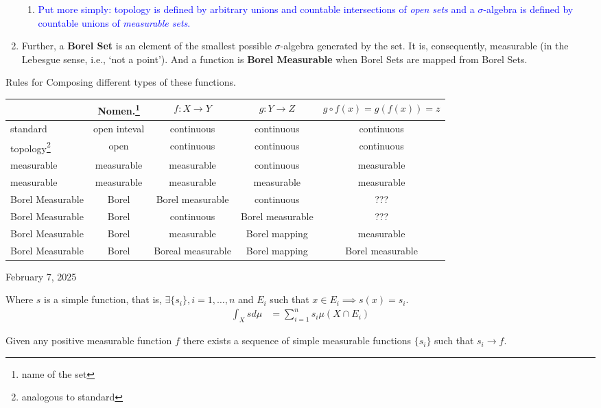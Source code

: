 \documentclass[10pt,a4paper]{report}
\newcommand{\BLUE}[1]{\textcolor{blue}{#1}}
\begin{document}
\begin{enumerate}
\begin{enumerate}
    		\item \BLUE{Put more simply: topology is defined by arbitrary unions and countable intersections of \textit{open sets} and a $\sigma$-algebra is defined by countable unions of \textit{measurable sets}.}
	\end{enumerate}      
    \item  Further, a \textbf{Borel Set} is an element of the smallest possible $\sigma$-algebra generated by the set.  It is, consequently, measurable (in the Lebesgue sense, i.e., ‘not a point’).  And a function is \textbf{Borel Measurable} when Borel Sets are mapped from Borel Sets.

\end{enumerate}

\noindent Rules for Composing different types of these functions.

\begin{tabular}{|l|c|c|c|c|}
\hline 
	& Nomen.\footnote{name of the set} & $f:X \to Y$ & $g:Y \to Z$ & $g\circ f(x) =g(f(x)) = z$ \\
	\hline
	standard & open inteval &continuous & continuous & continuous \\
	\hline
	topology\footnote{analogous to standard} & open &continuous & continuous & continuous \\
	\hline
	measurable & measurable & measurable & continuous & measurable \\
	\hline
	measurable & measurable & measurable & measurable & measurable \\
	\hline 
	Borel Measurable & Borel & Borel measurable  & continuous & ??? \\
	\hline 
	Borel Measurable & Borel & continuous & Borel measurable & ??? \\
	\hline 
	Borel Measurable & Borel & measurable & Borel mapping & measurable \\
	\hline 
	Borel Measurable & Borel & Boreal measurable & Borel mapping & Borel measurable \\
\hline
\end{tabular}

\newpage
\noindent February 7, 2025\\

\begin{definition}

Where $s$ is a simple function, that is, $\exists \{s_i\}, i= 1, \dots, n$ and $E_i$ such that $x \in E_i \implies s(x) = s_i$.
\begin{align*}
	\int_X s d\mu &= \sum_{i=1}^n s_i \mu(X \cap E_i)
\end{align*}
\end{definition}
\begin{theorem}
Given any positive measurable function $f$ there exists a sequence of simple measurable functions $\{s_i\}$ such that $s_i \to f$.
\end{theorem}
\end{document}
